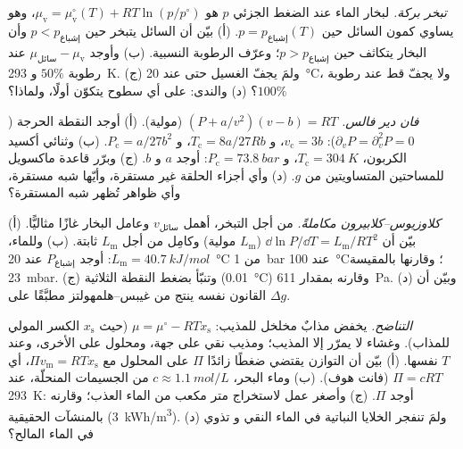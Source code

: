 \begin{exercise}[$\star\star$]\label{exo:b2:thermodynamic-potentials:8}
\emph{تبخر بركة.}  لبخار الماء
عند الضغط الجزئي $p$ هو $\mu_{\text{v}} = \mu_{\text{v}}^\circ(T) +
RT\ln(p/p^\circ)$، وهو يساوي كمون السائل حين $p = p_{\text{إشباع}}(T)$.
(أ) بيّن أن السائل يتبخر حين $p < p_{\text{إشباع}}$ وأن البخار
يتكاثف حين $p > p_{\text{إشباع}}$؛ وعرّف الرطوبة النسبية. (ب)
وأوجد $\mu_{\text{سائل}} - \mu_{\text{v}}$ عند رطوبة $50\%$ و \qty{293}{K}. (ج) ولمَ
يجفّ الغسيل حتى عند \qty{20}{\celsius}، ولا يجفّ قط عند رطوبة $100\%$؟
(د) والندى: على أي سطوح يتكوّن أولًا، ولماذا؟
\end{exercise}

\begin{exercise}[$\star\star$]\label{exo:b2:thermodynamic-potentials:9}
\emph{فان دير فالس.} $(P + a/v^2)(v - b) = RT$ (مولية). (أ) أوجد
النقطة الحرجة ($\partial_vP = \partial_v^2P = 0$): $v_{\text{c}} = 3b$،
و $T_{\text{c}} = 8a/27Rb$، و $P_{\text{c}} = a/27b^2$. (ب) وثنائي أكسيد الكربون،
$T_{\text{c}} = \qty{304}{K}$، و $P_{\text{c}} = \qty{73.8}{bar}$: أوجد $a$ و $b$. (ج)
وبرّر قاعدة ماكسويل للمساحتين المتساويتين من $g$. (د) وأي أجزاء الحلقة
غير مستقرة، وأيّها شبه مستقرة، وأي ظواهر تُظهر شبه المستقرة؟
\end{exercise}

\begin{exercise}[$\star\star\star$]\label{exo:b2:thermodynamic-potentials:10}
\emph{كلاوزيوس--كلابيرون مكاملةً.} من أجل التبخر، أهمل $v_{\text{سائل}}$
وعامل البخار غازًا مثاليًّا. (أ) بيّن أن $\dd\ln P/\dd T = L_{\text{m}}/RT^2$
($L_{\text{m}}$ مولية) وكامِل من أجل $L_{\text{m}}$ ثابتة. (ب) وللماء،
$L_{\text{m}} = \qty{40.7}{kJ/mol}$: أوجد $P_{\text{إشباع}}$ عند \qty{20}{\celsius} من
\qty{1}{bar} عند \qty{100}{\celsius}؛ وقارنها بالمقيسة \qty{23}{mbar}.
(ج) وتنبّأ بضغط النقطة الثلاثية (\qty{0.01}{\celsius}) وقارنه
بمقدار \qty{611}{Pa}. (د) وبيّن أن القانون نفسه ينتج من غيبس--هلمهولتز
مطبَّقًا على $\Delta g$.
\end{exercise}

\begin{exercise}[$\star\star\star$]\label{exo:b2:thermodynamic-potentials:11}
\emph{التناضح.} يخفض مذابٌ مخلخل  للمذيب:
$\mu = \mu^\circ - RTx_{\text{s}}$ (حيث $x_{\text{s}}$ الكسر المولي
للمذاب). وغشاء لا يمرّر إلا المذيب؛ ومذيب نقي على
جهة، ومحلول على الأخرى، وعند $T$ نفسها. (أ) بيّن أن التوازن
يقتضي ضغطًا زائدًا $\Pi$ على المحلول مع $\Pi v_{\text{m}} =
RTx_{\text{s}}$، أي $\Pi = cRT$ (فانت هوف). (ب) وماء البحر، $c \approx
\qty{1.1}{mol/L}$ من الجسيمات المنحلّة، عند \qty{293}{K}: أوجد $\Pi$. (ج) وأصغر
عمل لاستخراج متر مكعب من الماء العذب؛ وقارنه بالمنشآت الحقيقية
(\qty{3}{kWh/m^3}). (د) ولمَ تنفجر الخلايا النباتية في الماء النقي و
تذوي في الماء المالح؟
\end{exercise}

